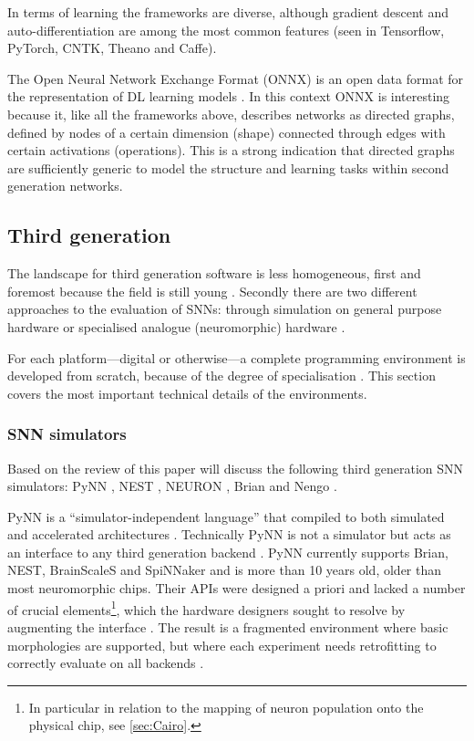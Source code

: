 \documentclass[report.tex]{subfiles}
\begin{document}
In terms of learning the frameworks are diverse, although gradient descent 
and auto-differentiation are among the most common features 
(seen in Tensorflow, PyTorch, CNTK, Theano and Caffe). 

The Open Neural Network Exchange Format (ONNX) is an open data format for the representation
of \gls{DL} learning models \cite{ONNX2018}. 
In this context ONNX is interesting because it, like all the frameworks above, describes 
networks as directed graphs, defined by nodes of a certain dimension (shape) connected through
edges with certain activations (operations).
This is a strong indication that directed graphs are sufficiently generic to model
the structure and learning tasks within second generation networks.

\subsection{Third generation}
The landscape for third generation software is less homogeneous, first and
foremost because the field is still young \cite{Maass1997}.
Secondly there are two different approaches to the evaluation of \gls{SNN}s:
through simulation on general purpose hardware or specialised analogue
(neuromorphic) hardware \cite{Maass1997, Davison2009, Albada2018}.

For each platform---digital or otherwise---a complete programming environment
is developed from scratch, because of the degree of specialisation
\cite{Walter2015, Lin2018}.
This section covers the most important technical details of
the environments.

\subsubsection{\Gls{SNN} simulators} \label{sec:SNN-simulators}
Based on the review of \textcite{Blundell2018} this paper will discuss
the following third generation \gls{SNN} simulators: PyNN \cite{Davison2009},
NEST \cite{Gewaltig2007}, NEURON \cite{Carnevale2007},
Brian \cite{Goodman2013} and Nengo \cite{Eliasmith2015}.

PyNN is a ``simulator-independent language''
\cite{PyNN2018} that compiled to both simulated and
accelerated architectures \cite{Davison2009}.
Technically PyNN is not a simulator but acts as an interface to any third generation
backend \cite{Davison2009}.
PyNN currently supports Brian, NEST, BrainScaleS and SpiNNaker
and is more than 10 years old, \cite{Davison2009} older
than most neuromorphic chips. 
Their \gls{API}s were designed a priori and lacked a number of crucial
elements\footnote{In particular in relation to the mapping of neuron population
onto the physical chip, see \ref{sec:Cairo}.}, which the hardware designers sought
to resolve by augmenting the interface \cite{Pfeil2013, PyNN2018}.
The result is a fragmented environment where basic morphologies are supported, 
but where each experiment needs retrofitting to correctly evaluate on all
backends \cite{PyNN2018}.
\end{document}
